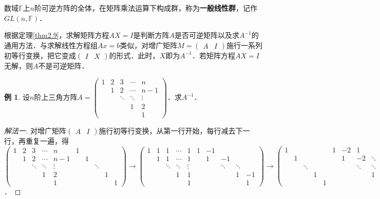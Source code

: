 \documentclass[a4paper,fontset=windows]{ctexbook}
\theoremstyle{definition}
\newtheorem{example}{例}[chapter]
\begin{document}
数域$\mathbb{F}$上$n$阶可逆方阵的全体，在矩阵乘法运算下构成群，称为{\bf 一般线性群}，记作$GL(n,\mathbb{F})$．

\medskip 根据定理\ref{thm2.9}，求解矩阵方程$AX=I$是判断方阵$A$是否可逆矩阵以及求$A^{-1}$的通用方法．与求解线性方程组$Ax=b$类似，对增广矩阵$M=\begin{pmatrix}A&I\end{pmatrix}$施行一系列初等行变换，把它变成$\begin{pmatrix}I&X\end{pmatrix}$的形式．此时，$X$即为$A^{-1}$．若矩阵方程$AX=I$无解，则$A$不是可逆矩阵．

\begin{example}
设$n$阶上三角方阵$A=\begin{pmatrix}1&2&3&\cdots&n \\ &1&2&\cdots&n-1 \\ &&\ddots&\ddots&\vdots \\ &&&1&2 \\ &&&&1\end{pmatrix}$．求$A^{-1}$．
\end{example}

\begin{proof}[解法一]
对增广矩阵$\begin{pmatrix}A&I\end{pmatrix}$施行初等行变换，从第一行开始，每行减去下一行，再重复一遍，得 \\
$\begin{pmatrix}1&2&3&\cdots&n&1&&&& \\ &1&2&\cdots&n-1&&1&&& \\ &&\ddots&\ddots&\vdots&&&\ddots&& \\ &&&1&2&&&&1& \\ &&&&1&&&&&1\end{pmatrix} \to \begin{pmatrix}1&1&1&\cdots&1&1&-1&&& \\ &1&1&\cdots&1&&1&-1&& \\ &&\ddots&\ddots&\vdots&&&\ddots&\ddots& \\ &&&1&1&&&&1&-1 \\ &&&&1&&&&&1\end{pmatrix} \to \begin{pmatrix}1&&&&&1&-2&1&& \\ &1&&&&&1&-2&\ddots& \\ &&\ddots&&&&&\ddots&\ddots&1 \\ &&&1&&&&&1&-2 \\ &&&&1&&&&&1\end{pmatrix} \Rightarrow A^{-1}=\begin{pmatrix}1&-2&1&& \\ &1&-2&\ddots& \\ &&\ddots&\ddots&1 \\ &&&1&-2 \\ &&&&1\end{pmatrix}$．
\end{proof}
\end{document}
